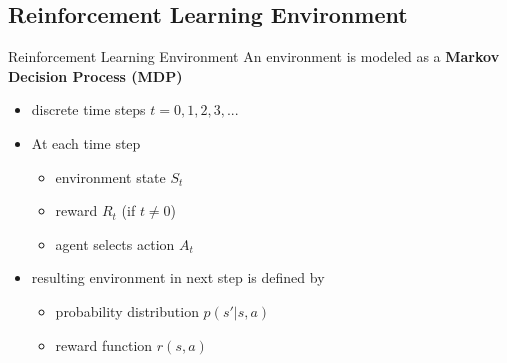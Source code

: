 \documentclass[aspectratio=169, 11pt]{beamer}
\begin{document}
\subsection{Reinforcement Learning Environment}
\begin{frame}{Reinforcement Learning Environment}
  An environment is modeled as a \textbf{Markov Decision Process (MDP)}

  \begin{itemize}
    \item discrete time steps $t = 0, 1, 2, 3, ...$
    \item At each time step
      \begin{itemize}
        \item environment state $S_t$
        \item reward $R_t$ (if $t \neq 0$)
        \item agent selects action $A_t$
      \end{itemize}
    \item resulting environment in next step is defined by
      \begin{itemize}
        \item probability distribution $p(s'|s,a)$
        \item reward function $r(s,a)$
      \end{itemize}
  \end{itemize}
\end{frame}
\end{document}
